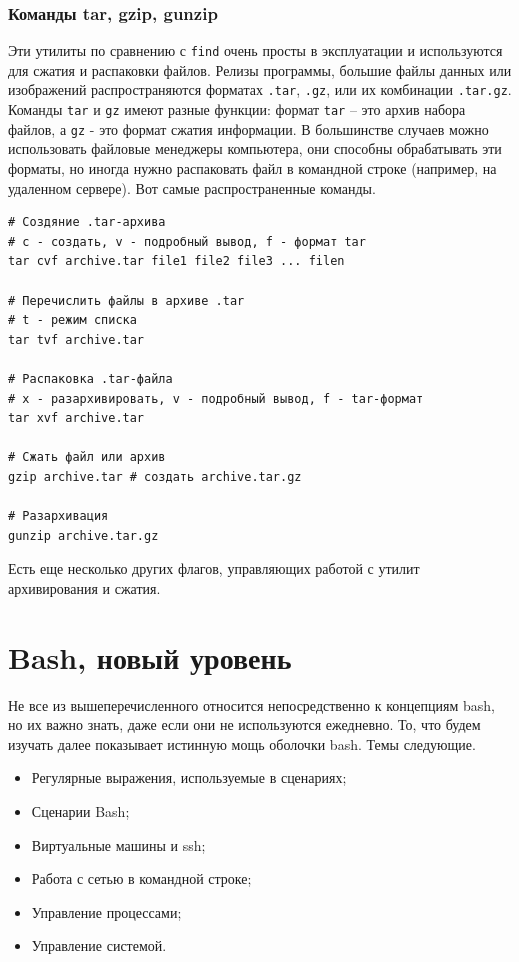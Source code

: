 \documentclass[a4paper,12pt,final,openany]{extbook}
\providecommand{\tightlist}{%
  \setlength{\itemsep}{0pt}\setlength{\parskip}{0pt}}
\begin{document}
\hypertarget{tar-gzip-gunzip}{%
\subsection{\texorpdfstring{\protect\hyperlink{tar-gzip-gunzip}{}Команды
tar, gzip, gunzip}{Команды tar, gzip, gunzip}}\label{tar-gzip-gunzip}}

Эти утилиты по сравнению с \texttt{find} очень просты в эксплуатации и используются
для сжатия и распаковки файлов. Релизы программы,
большие файлы данных или изображений распространяются форматах
\texttt{.tar}, \texttt{.gz}, или их комбинации \texttt{.tar.gz}. Команды \texttt{tar} и
\texttt{gz} имеют разные функции: формат \texttt{tar} -- это архив
набора файлов, а \texttt{gz} - это формат сжатия информации. В большинстве случаев можно использовать файловые менеджеры компьютера, они
способны обрабатывать эти форматы, но иногда нужно распаковать файл в
командной строке (например, на удаленном сервере). Вот самые
распространенные команды.
\begin{verbatim}
# Создяние .tar-архива
# c - создать, v - подробный вывод, f - формат tar
tar cvf archive.tar file1 file2 file3 ... filen

# Перечислить файлы в архиве .tar
# t - режим списка
tar tvf archive.tar

# Распаковка .tar-файла
# x - разархивировать, v - подробный вывод, f - tar-формат
tar xvf archive.tar

# Сжать файл или архив
gzip archive.tar # создать archive.tar.gz

# Разархивация
gunzip archive.tar.gz
\end{verbatim}
Есть еще несколько других флагов, управляющих работой с утилит
архивирования и сжатия.

\hypertarget{Advanced-Bash}{%
\chapter{Bash, новый уровень}\label{Advanced-Bash}}

Не все из вышеперечисленного относится непосредственно к концепциям
bash, но их важно знать, даже если они не используются ежедневно. То,
что будем изучать далее показывает истинную мощь оболочки bash. Темы
следующие.
\begin{itemize}
\tightlist
\item
  Регулярные выражения, используемые в сценариях;
\item
  Сценарии Bash;
\item
  Виртуальные машины и ssh;
\item
  Работа с сетью в командной строке;
\item
  Управление процессами;
\item
  Управление системой.
\end{itemize}
\end{document}
